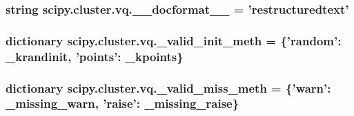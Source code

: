 \subsubsection[{\+\_\+\+\_\+docformat\+\_\+\+\_\+}]{\setlength{\rightskip}{0pt plus 5cm}string scipy.\+cluster.\+vq.\+\_\+\+\_\+docformat\+\_\+\+\_\+ = 'restructuredtext'}\label{namespacescipy_1_1cluster_1_1vq_a269068c9eec58420eecf07db13f0e5d5}
\hypertarget{namespacescipy_1_1cluster_1_1vq_a16f327fb1e0d050f586f210c9e285727}{}
\subsubsection[{\+\_\+valid\+\_\+init\+\_\+meth}]{\setlength{\rightskip}{0pt plus 5cm}dictionary scipy.\+cluster.\+vq.\+\_\+valid\+\_\+init\+\_\+meth = \{'random'\+: \+\_\+krandinit, 'points'\+: \+\_\+kpoints\}}\label{namespacescipy_1_1cluster_1_1vq_a16f327fb1e0d050f586f210c9e285727}
\hypertarget{namespacescipy_1_1cluster_1_1vq_abbc099b68b254c57a0c261d94f38b432}{}
\subsubsection[{\+\_\+valid\+\_\+miss\+\_\+meth}]{\setlength{\rightskip}{0pt plus 5cm}dictionary scipy.\+cluster.\+vq.\+\_\+valid\+\_\+miss\+\_\+meth = \{'{\bf warn}'\+: \+\_\+missing\+\_\+warn, 'raise'\+: \+\_\+missing\+\_\+raise\}}\label{namespacescipy_1_1cluster_1_1vq_abbc099b68b254c57a0c261d94f38b432}
